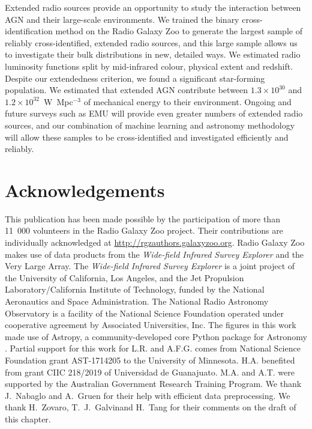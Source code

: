 \documentclass[11pt, a4paper]{book}
\providecommand{\DIFaddtex}[1]{{\protect\color{blue}\uwave{#1}}} %
\providecommand{\DIFaddbegin}{} %
\providecommand{\DIFaddend}{} %
\providecommand{\DIFadd}[1]{\texorpdfstring{\DIFaddtex{#1}}{#1}} %
\newcommand{\DIFaddincludegraphics}[2][]{{\color{blue}\fbox{\DIFOincludegraphics[#1]{#2}}}} %
\DeclareRobustCommand{\DIFaddbegin}{\DIFOaddbegin \let\includegraphics\DIFaddincludegraphics} %
\DeclareRobustCommand{\DIFaddend}{\DIFOaddend \let\includegraphics\DIFOincludegraphics} %
\begin{document}
  Extended radio sources provide an opportunity to study the interaction between AGN and their large-scale environments. We trained the binary cross-identification method on the Radio Galaxy Zoo to generate the largest sample of reliably cross-identified, extended radio sources, and this large sample allows us to investigate their bulk distributions in new, detailed ways. We estimated radio luminosity functions split by mid-infrared colour, physical extent and redshift. Despite our extendedness criterion, we found a significant star-forming population. We estimated that extended AGN contribute between $1.3 \times 10^{30}$ and $1.2 \times 10^{32}$~W~Mpc$^{-3}$ of mechanical energy to their environment. Ongoing and future surveys such as EMU will provide even greater numbers of extended radio sources, and our combination of machine learning and astronomy methodology will allow these samples to be cross-identified and investigated efficiently and reliably.

\section{Acknowledgements}

This publication has been made possible by the participation of more than
11~000 volunteers in the Radio Galaxy Zoo project. Their contributions are
individually acknowledged at \url{http://rgzauthors.galaxyzoo.org}. Radio
Galaxy Zoo makes use of data products from the \emph{Wide-field Infrared Survey
Explorer} and the Very Large Array. The \emph{Wide-field Infrared Survey Explorer}
is a joint project of the University of California, Los Angeles, and the Jet
Propulsion Laboratory/California Institute of Technology, funded by the
National Aeronautics and Space Administration. The National Radio Astronomy
Observatory is a facility of the National Science Foundation operated under
cooperative agreement by Associated Universities, Inc. The figures in this
work made use of Astropy, a community-developed core Python package for
Astronomy \citep{astropy}. Partial support for this work for L.R. and A.F.G. comes from National Science Foundation grant AST-1714205 to the University of Minnesota. H.A. benefited from grant CIIC 218/2019 of Universidad de Guanajuato. M.A. and A.T. were supported by the Australian Government Research Training Program. We thank J.~Nabaglo and A.~Gruen for their help with efficient data preprocessing. We thank H.~Zovaro, T.~J.~Galvin\DIFaddbegin \DIFadd{, }\DIFaddend and H.~Tang for their comments on the draft of this chapter.
\end{document}
